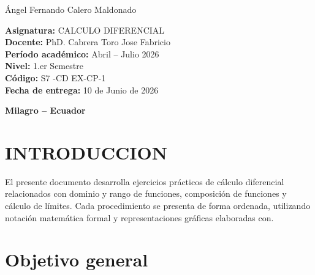 \documentclass[12pt,a4paper]{article}
\begin{document}
\begin{titlepage}
\begin{minipage}{0.95\textwidth}
			{\Large\color{azulUNEMI}
				\hspace*{1cm}Ángel Fernando Calero Maldonado\\
			}	
			\vspace{1.2cm}
			
			{\Large\color{naranjaUNEMI}
				\textbf{Asignatura:}}
			{\Large\color{azulUNEMI} CALCULO DIFERENCIAL}\\
			
			{\Large\color{naranjaUNEMI}
				\textbf{Docente:}}
			{\Large\color{azulUNEMI} PhD. Cabrera Toro Jose Fabricio}\\
			
			{\Large\color{naranjaUNEMI}
				\textbf{Período académico:}}
			{\Large\color{azulUNEMI} Abril -- Julio 2026}\\
			
			{\Large\color{naranjaUNEMI}
				\textbf{Nivel:}}
			{\Large\color{azulUNEMI} 1.er Semestre}\\
			
			{\Large\color{naranjaUNEMI}
				\textbf{Código:}}
			{\Large\color{azulUNEMI} S7 -CD EX-CP-1}\\
			
			{\Large\color{naranjaUNEMI}
				\textbf{Fecha de entrega:}}
			{\Large\color{azulUNEMI} 10 de Junio de 2026}
			
		\end{minipage}
		
		\vfill
		
		{\large
			\color{azulUNEMI}
			\textbf{Milagro -- Ecuador}\par}
		
	\end{titlepage}
	
	
	\section{INTRODUCCION}
	
	El presente documento desarrolla ejercicios prácticos de cálculo diferencial relacionados con dominio y rango de funciones, composición de funciones y cálculo de límites. Cada procedimiento se presenta de forma ordenada, utilizando notación matemática formal y representaciones gráficas elaboradas con.
	
	\section{Objetivo general}
	
\end{document}
